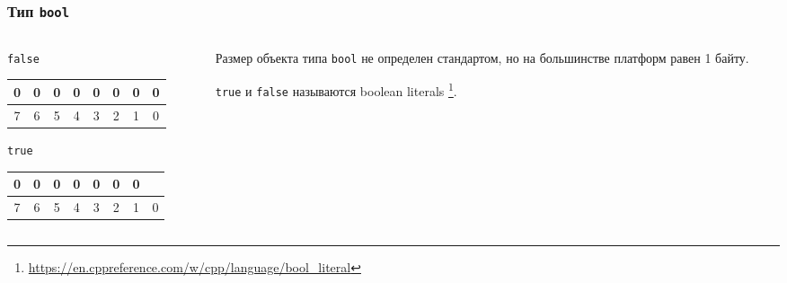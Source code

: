 \documentclass[compress, 8pt, aspectratio=169]{beamer}
\newenvironment{eightbit}{%
    \begin{center}
        \begin{tabular}{ |m{0.2cm}|m{0.2cm}|m{0.2cm}|m{0.2cm}|m{0.2cm}|m{0.2cm}|m{0.2cm}|m{0.2cm}|  }
            \hline
}{
        \hline
        \multicolumn{1}{c}{\color{gray}\tiny{7}} &
        \multicolumn{1}{c}{\color{gray}\tiny{6}} &
        \multicolumn{1}{c}{\color{gray}\tiny{5}} &
        \multicolumn{1}{c}{\color{gray}\tiny{4}} &
        \multicolumn{1}{c}{\color{gray}\tiny{3}} &
        \multicolumn{1}{c}{\color{gray}\tiny{2}} &
        \multicolumn{1}{c}{\color{gray}\tiny{1}} &
        \multicolumn{1}{c}{\color{gray}\tiny{0}} \\
        \end{tabular}
    \end{center}
}
\begin{document}
\begin{frame}[fragile]

    \frametitle{Тип \texttt{bool}}

    \begin{columns}[T]

        \begin{column}{0.5\textwidth}

            \verb|false|

            \begin{eightbit}
                0 & 0 & 0 & 0 & 0 & 0 & 0 & 0 \\
            \end{eightbit}

            \verb|true|

            \begin{eightbit}
                0 & 0 & 0 & 0 & 0 & 0 & 0 & \cellcolor{gray}{1} \\
            \end{eightbit}

        \end{column}

        \begin{column}{0.5\textwidth}

            Размер объекта типа \verb|bool| не определен стандартом,
            но на большинстве платформ равен 1 байту. \hfill \break

            \verb|true| и \verb|false| называются boolean literals
            \footnote{\tiny\url{https://en.cppreference.com/w/cpp/language/bool_literal}}.

        \end{column}

    \end{columns}

\end{frame}
\end{document}
